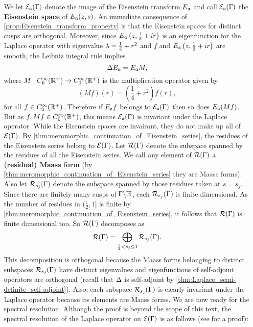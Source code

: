       We let $\mathcal{E}_{\mathfrak{a}}(\Gamma)$ denote the image of the Eisenstein transform $E_{\mathfrak{a}}$ and call $\mathcal{E}_{\mathfrak{a}}(\Gamma)$ the \textbf{Eisenstein space} of $E_{\mathfrak{a}}(z,s)$. An immediate consequence of \cref{prop:Eisenstein_transform_property} is that the Eisenstein spaces for distinct cusps are orthogonal. Moreover, since $E_{\mathfrak{a}}\left(z,\frac{1}{2}+ir\right)$ is an eigenfunction for the Laplace operator with eigenvalue $\lambda = \frac{1}{4}+r^{2}$ and $f$ and $E_{\mathfrak{a}}\left(z,\frac{1}{2}+ir\right)$ are smooth, the Leibniz integral rule implies
      \[
        \Delta E_{\mathfrak{a}}= E_{\mathfrak{a}}M,
      \]
      where $M:C_{0}^{\infty}(\mathbb{R}^{+}) \to C_{0}^{\infty}(\mathbb{R}^{+})$ is the multiplication operator given by
      \[
        (Mf)(r) = \left(\frac{1}{4}+r^{2}\right)f(r),
      \]
      for all $f \in C_{0}^{\infty}(\mathbb{R}^{+})$. Therefore if $E_{\mathfrak{a}}f$ belongs to $\mathcal{E}_{\mathfrak{a}}(\Gamma)$ then so does $E_{\mathfrak{a}}(Mf)$. But as $f,Mf \in C_{0}^{\infty}(\mathbb{R}^{+})$, this means $\mathcal{E}_{\mathfrak{a}}(\Gamma)$ is invariant under the Laplace operator. While the Eisenstein spaces are invairant, they do not make up all of $\mathcal{E}(\Gamma)$. By \cref{thm:meromorphic_continuation_of_Eisenstein_series}, the residues of the Eisenstein series belong to $\mathcal{E}(\Gamma)$. Let $\mathcal{R}(\Gamma)$ denote the subspace spanned by the residues of all the Eisenstein series. We call any element of $\mathcal{R}(\Gamma)$ a \textbf{(residual) Maass form} (by \cref{thm:meromorphic_continuation_of_Eisenstein_series} they are Maass forms). Also let $\mathcal{R}_{s_{j}}(\Gamma)$ denote the subspace spanned by those residues taken at $s = s_{j}$. Since there are finitely many cusps of $\Gamma\backslash\mathbb{H}$, each $\mathcal{R}_{s_{j}}(\Gamma)$ is finite dimensional. As the number of residues in $(\frac{1}{2},1]$ is finite by \cref{thm:meromorphic_continuation_of_Eisenstein_series}, it follows that $\mathcal{R}(\Gamma)$ is finite dimensional too. So $\mathcal{R}(\Gamma)$ decomposes as
      \[
        \mathcal{R}(\Gamma) = \bigoplus_{\frac{1}{2} < s_{j} \le 1}\mathcal{R}_{s_{j}}(\Gamma).
      \]
      This decomposition is orthogonal because the Maass forms belonging to distinct subspaces $\mathcal{R}_{s_{j}}(\Gamma)$ have distinct eigenvalues and eigenfunctions of self-adjoint operators are orthogonal (recall that $\Delta$ is self-adjoint by \cref{thm:Laplace_semi-definite_self-adjoint}). Also, each subspace $\mathcal{R}_{s_{j}}(\Gamma)$ is clearly invariant under the Laplace operator because its elements are Maass forms.
      We are now ready for the spectral resolution. Although the proof is beyond the scope of this text, the spectral resolution of the Laplace operator on $\mathcal{E}(\Gamma)$ is as follows (see \cite{iwaniec2002spectral} for a proof):

